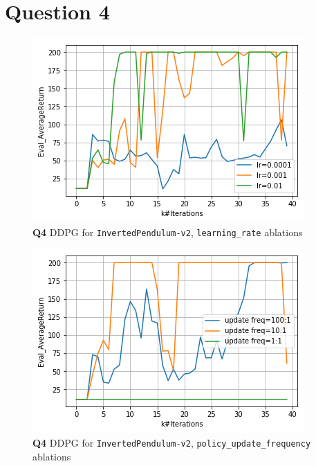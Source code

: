 \documentclass[11pt]{article}
\begin{document}
\clearpage


\section{Question 4}
\label{sec:org04f01b3}

\begin{figure}[htbp]
\centering
\includegraphics[width=.9\linewidth]{./41.png}
\caption{\textbf{Q4}  DDPG for \texttt{InvertedPendulum-v2}, \texttt{learning\_rate} ablations}
\end{figure}


\begin{figure}[htbp]
\centering
\includegraphics[width=.9\linewidth]{./42.png}
\caption{\textbf{Q4}  DDPG for \texttt{InvertedPendulum-v2}, \texttt{policy\_update\_frequency} ablations}
\end{figure}
\end{document}

